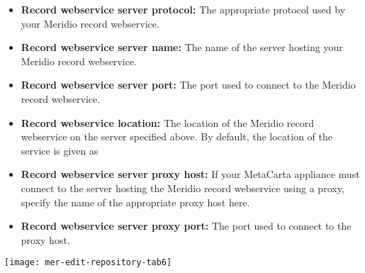 \begin{itemize}

\item \textbf{Record webservice server protocol:} The appropriate protocol used by your Meridio record webservice.

\item \textbf{Record webservice server name:}  The name of the server hosting your Meridio record webservice.

\item \textbf{Record webservice server port:} The port used to connect to the Meridio record webservice.

\item \textbf{Record webservice location:} The location of the Meridio record webservice on the server specified above. By default, the location of the service is given as 

\item \textbf{Record webservice server proxy host:} If your MetaCarta appliance must connect to the server hosting the Meridio record webservice using a proxy, specify the name of the appropriate proxy host here.

\item \textbf{Record webservice server proxy port:} The port used to connect to the proxy host.

\end{itemize}


\texttt{[image: mer-edit-repository-tab6]}


